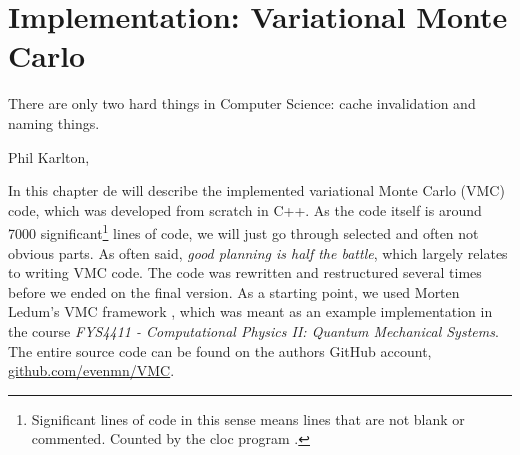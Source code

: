 \chapter{Implementation: Variational Monte Carlo} \label{chp:WFE}
\epigraph{There are only two hard things in Computer Science: cache invalidation and naming things.}{Phil Karlton, \cite{fowler_bliki:_nodate}}

In this chapter de will describe the implemented variational Monte Carlo (VMC) code, which was developed from scratch in C++. As the code itself is around 7000 significant\footnote{Significant lines of code in this sense means lines that are not blank or commented. Counted by the cloc program \cite{aldanial_cloc_2019}.} lines of code, we will just go through selected and often not obvious parts. As often said, \textit{good planning is half the battle}, which largely relates to writing VMC code. The code was rewritten and restructured several times before we ended on the final version. As a starting point, we used Morten Ledum's VMC framework \cite{ledum_simple_2016}, which was meant as an example implementation in the course \textit{FYS4411 - Computational Physics II: Quantum Mechanical Systems}. The entire source code can be found on the authors GitHub account, \url{github.com/evenmn/VMC}.

